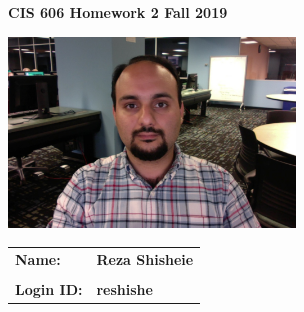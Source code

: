 \documentclass[11pt]{article}
\begin{document}
\thispagestyle{plain}

\begin{center}
{\Large \bf CIS 606 \hfil Homework 2 \hfil Fall 2019} \\
\end{center}

\vskip 1in 

\centerline{\includegraphics[width=3in]{photo.jpg}}

\vskip 0.5in 

\begin{center}
\begin{tabular}{ll}
{\bf Name:}     & {\bf Reza Shisheie } \\ \\
{\bf Login ID:} & {\bf reshishe }   
\end{tabular}
\end{center}

\newpage
\end{document}
